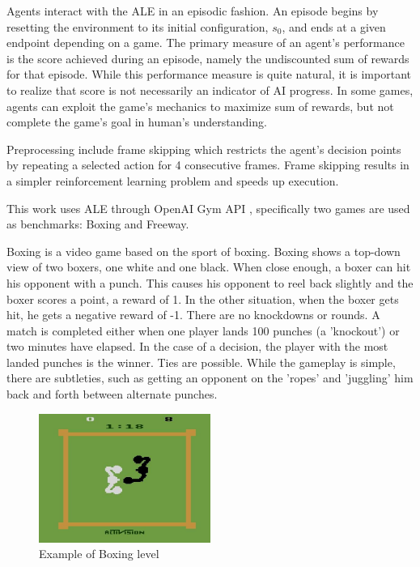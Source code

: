 Agents interact with the ALE in an episodic fashion. An episode begins by resetting the environment to its initial configuration, $s_0$, and ends at a given endpoint depending on a game. The primary measure of an agent’s performance is the score achieved during an episode, namely the undiscounted sum of rewards for that episode. While this performance measure is quite natural, it is important to realize that score is not necessarily an indicator of AI progress. In some games, agents can exploit the game's mechanics to maximize sum of rewards, but not complete the game's goal in human's understanding. \cite{Study.FaultyReward}

Preprocessing include frame skipping \cite{Study.FrameSkipping} which restricts the agent’s decision points by repeating a selected action for 4 consecutive frames. Frame skipping results in a simpler reinforcement learning problem and speeds up execution.

This work uses ALE through OpenAI Gym API \cite{Code.OpenAIGym}, specifically two games are used as benchmarks: Boxing and Freeway.

Boxing is a video game based on the sport of boxing. Boxing shows a top-down view of two boxers, one white and one black. When close enough, a boxer can hit his opponent with a punch. This causes his opponent to reel back slightly and the boxer scores a point, a reward of 1. In the other situation, when the boxer gets hit, he gets a negative reward of -1. There are no knockdowns or rounds. A match is completed either when one player lands 100 punches (a 'knockout') or two minutes have elapsed. In the case of a decision, the player with the most landed punches is the winner. Ties are possible. 
While the gameplay is simple, there are subtleties, such as getting an opponent on the 'ropes' and 'juggling' him back and forth between alternate punches. 

\begin{figure}[H]
\includegraphics[width=0.5\textwidth,keepaspectratio]{figures/Boxing.jpg}
\caption[Boxing]{Example of Boxing level}
\label{Fig.Boxing}
\end{figure}

